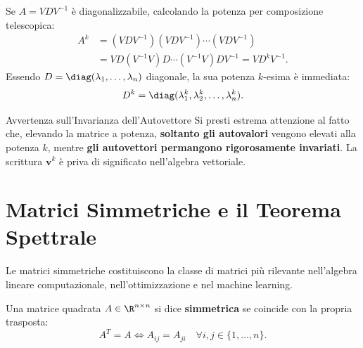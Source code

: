 \begin{corollary}
Se $A = V D V^{-1}$ \`e diagonalizzabile, calcolando la potenza per composizione telescopica:
\begin{align}
    A^k &= (V D V^{-1})(V D V^{-1}) \cdots (V D V^{-1}) \nonumber \\
    &= V D (V^{-1}V) D \cdots (V^{-1}V) D V^{-1} = V D^k V^{-1}.
\end{align}
Essendo $D = \diag(\lambda_1, \dots, \lambda_n)$ diagonale, la sua potenza $k$-esima \`e immediata:
\begin{equation}
    D^k = \diag(\lambda_1^k, \lambda_2^k, \dots, \lambda_n^k).
\end{equation}
\end{corollary}

\begin{alertblock}{Avvertenza sull'Invarianza dell'Autovettore}
Si presti estrema attenzione al fatto che, elevando la matrice a potenza, \textbf{soltanto gli autovalori} vengono elevati alla potenza $k$, mentre \textbf{gli autovettori permangono rigorosamente invariati}. La scrittura $\mathbf{v}^k$ \`e priva di significato nell'algebra vettoriale.
\end{alertblock}

\FloatBarrier
\section{Matrici Simmetriche e il Teorema Spettrale}

Le matrici simmetriche costituiscono la classe di matrici pi\`u rilevante nell'algebra lineare computazionale, nell'ottimizzazione e nel machine learning.

\begin{definition}
Una matrice quadrata $A \in \R^{n \times n}$ si dice \textbf{simmetrica} se coincide con la propria trasposta:
\begin{equation}
    A^T = A \iff A_{ij} = A_{ji} \quad \forall i, j \in \{1, \dots, n\}.
\end{equation}
\end{definition}

